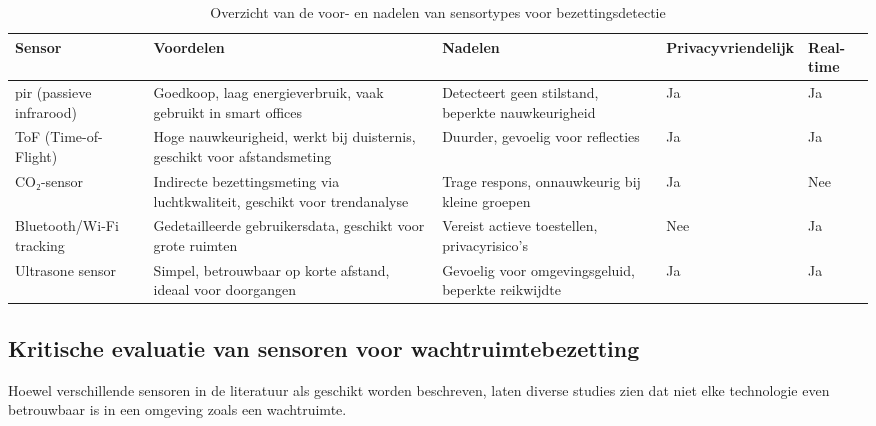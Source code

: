 \begin{table}[h!]
    \small
    \centering
    \caption{Overzicht van de voor- en nadelen van sensortypes voor bezettingsdetectie}
    \label{tab:sensorvergelijking}
    \begin{tabular}{|p{2.5cm}|p{3cm}|p{2.8cm}|p{3.4cm}|p{1.9cm}|}
        \hline
        \textbf{Sensor} & \textbf{Voordelen} & \textbf{Nadelen} & \textbf{Privacyvriendelijk} & \textbf{Real-time} \\ \hline
        \gls{pir} (passieve infrarood) & Goedkoop, laag energieverbruik, vaak gebruikt in smart offices & Detecteert geen stilstand, beperkte nauwkeurigheid & Ja & Ja \\ \hline
        ToF (Time-of-Flight) & Hoge nauwkeurigheid, werkt bij duisternis, geschikt voor afstandsmeting & Duurder, gevoelig voor reflecties & Ja & Ja \\ \hline
        CO₂-sensor & Indirecte bezettingsmeting via luchtkwaliteit, geschikt voor trendanalyse & Trage respons, onnauwkeurig bij kleine groepen & Ja & Nee \\ \hline
        Bluetooth/Wi-Fi tracking & Gedetailleerde gebruikersdata, geschikt voor grote ruimten & Vereist actieve toestellen, privacyrisico’s & Nee & Ja \\ \hline
        Ultrasone sensor & Simpel, betrouwbaar op korte afstand, ideaal voor doorgangen & Gevoelig voor omgevingsgeluid, beperkte reikwijdte & Ja & Ja \\ \hline
    \end{tabular}
\end{table}


\subsection{Kritische evaluatie van sensoren voor wachtruimtebezetting}
Hoewel verschillende sensoren in de literatuur als geschikt worden beschreven, laten diverse studies zien dat niet elke technologie even betrouwbaar is in een omgeving zoals een wachtruimte.

